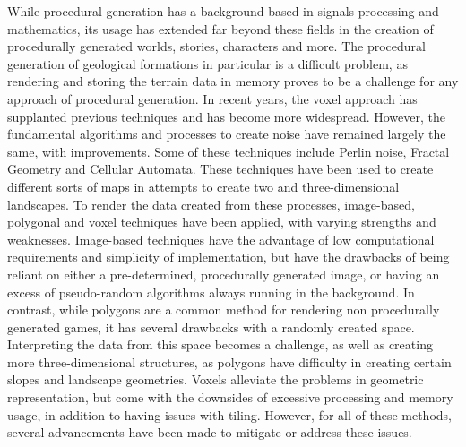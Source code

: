 \documentclass[10pt]{report}
\begin{document}
		While procedural generation has a background based in signals processing and mathematics, its usage has extended far beyond these fields in the creation of procedurally generated worlds, stories, characters and more. The procedural generation of geological formations in particular is a difficult problem, as rendering and storing the terrain data in memory proves to be a challenge for any approach of procedural generation. In recent years, the voxel approach has supplanted previous techniques and has become more widespread. However, the fundamental algorithms and processes to create noise have remained largely the same, with improvements. Some of these techniques include Perlin noise, Fractal Geometry and Cellular Automata. These techniques have been used to create different sorts of maps in attempts to create two and three-dimensional landscapes. To render the data created from these processes, image-based, polygonal and voxel techniques have been applied, with varying strengths and weaknesses. Image-based techniques have the advantage of low computational requirements and simplicity of implementation, but have the drawbacks of being reliant on either a pre-determined, procedurally generated image, or having an excess of pseudo-random algorithms always running in the background. In contrast, while polygons are a common method for rendering non procedurally generated games, it has several drawbacks with a randomly created space. Interpreting the data from this space becomes a challenge, as well as creating more three-dimensional structures, as polygons have difficulty in creating certain slopes and landscape geometries. Voxels alleviate the problems in geometric representation, but come with the downsides of excessive processing and memory usage, in addition to having issues with tiling. However, for all of these methods, several advancements have been made to mitigate or address these issues. 
	
	\newpage
	\renewcommand{\bibname}{References}
	
		
\end{document}
